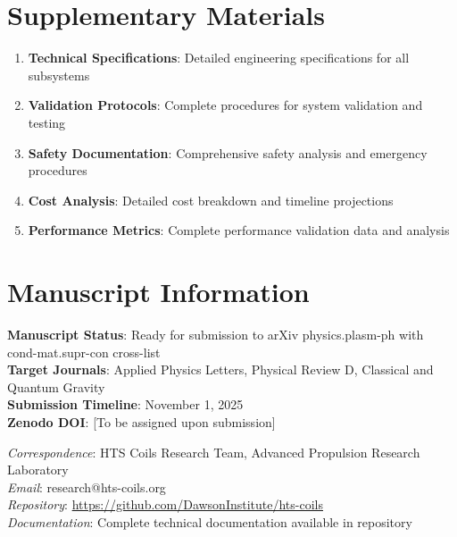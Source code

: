 \documentclass[12pt,a4paper]{article}
\begin{document}
\section{Supplementary Materials}

\begin{enumerate}
\item \textbf{Technical Specifications}: Detailed engineering specifications for all subsystems
\item \textbf{Validation Protocols}: Complete procedures for system validation and testing
\item \textbf{Safety Documentation}: Comprehensive safety analysis and emergency procedures
\item \textbf{Cost Analysis}: Detailed cost breakdown and timeline projections
\item \textbf{Performance Metrics}: Complete performance validation data and analysis
\end{enumerate}

\section*{Manuscript Information}

\textbf{Manuscript Status}: Ready for submission to arXiv physics.plasm-ph with cond-mat.supr-con cross-list\\
\textbf{Target Journals}: Applied Physics Letters, Physical Review D, Classical and Quantum Gravity\\
\textbf{Submission Timeline}: November 1, 2025\\
\textbf{Zenodo DOI}: [To be assigned upon submission]

\textit{Correspondence}: HTS Coils Research Team, Advanced Propulsion Research Laboratory\\
\textit{Email}: research@hts-coils.org\\
\textit{Repository}: \url{https://github.com/DawsonInstitute/hts-coils}\\
\textit{Documentation}: Complete technical documentation available in repository
\end{document}
